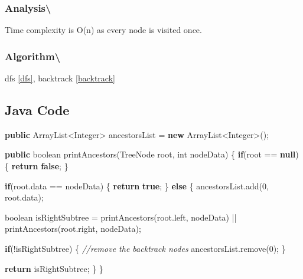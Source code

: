 \documentclass[]{book}
\newenvironment{Shaded}{\begin{snugshade}}{\end{snugshade}}
\newcommand{\BuiltInTok}[1]{#1}
\newcommand{\CommentTok}[1]{\textcolor[rgb]{0.56,0.35,0.01}{\textit{#1}}}
\newcommand{\DataTypeTok}[1]{\textcolor[rgb]{0.13,0.29,0.53}{#1}}
\newcommand{\DecValTok}[1]{\textcolor[rgb]{0.00,0.00,0.81}{#1}}
\newcommand{\FunctionTok}[1]{\textcolor[rgb]{0.00,0.00,0.00}{#1}}
\newcommand{\KeywordTok}[1]{\textcolor[rgb]{0.13,0.29,0.53}{\textbf{#1}}}
\newcommand{\NormalTok}[1]{#1}
\begin{document}
\hypertarget{analysis-93}{%
\subsubsection{Analysis\textbackslash{}}\label{analysis-93}}

Time complexity is O(n) as every node is visited once.

\hypertarget{algorithm-95}{%
\subsubsection{Algorithm\textbackslash{}}\label{algorithm-95}}

dfs \ref{dfs}, backtrack \ref{backtrack}

\hypertarget{java-code-56}{%
\subsection{Java Code}\label{java-code-56}}

\begin{Shaded}
\begin{Highlighting}[]
\KeywordTok{public} \BuiltInTok{ArrayList}\NormalTok{<}\BuiltInTok{Integer}\NormalTok{> ancestorsList = }\KeywordTok{new} \BuiltInTok{ArrayList}\NormalTok{<}\BuiltInTok{Integer}\NormalTok{>();}

\KeywordTok{public} \DataTypeTok{boolean} \FunctionTok{printAncestors}\NormalTok{(}\BuiltInTok{TreeNode}\NormalTok{ root, }\DataTypeTok{int}\NormalTok{ nodeData) \{}
    \KeywordTok{if}\NormalTok{(root == }\KeywordTok{null}\NormalTok{) \{}
        \KeywordTok{return} \KeywordTok{false}\NormalTok{;}
\NormalTok{    \}}

    \KeywordTok{if}\NormalTok{(root.}\FunctionTok{data}\NormalTok{ == nodeData) \{}
        \KeywordTok{return} \KeywordTok{true}\NormalTok{;}
\NormalTok{    \} }\KeywordTok{else}\NormalTok{ \{}
\NormalTok{        ancestorsList.}\FunctionTok{add}\NormalTok{(}\DecValTok{0}\NormalTok{, root.}\FunctionTok{data}\NormalTok{);}

        \DataTypeTok{boolean}\NormalTok{ isRightSubtree = }\FunctionTok{printAncestors}\NormalTok{(root.}\FunctionTok{left}\NormalTok{, nodeData) || }\FunctionTok{printAncestors}\NormalTok{(root.}\FunctionTok{right}\NormalTok{, nodeData);}

        \KeywordTok{if}\NormalTok{(!isRightSubtree) \{}
            \CommentTok{//remove the backtrack nodes}
\NormalTok{            ancestorsList.}\FunctionTok{remove}\NormalTok{(}\DecValTok{0}\NormalTok{);}
\NormalTok{        \}}

        \KeywordTok{return}\NormalTok{ isRightSubtree;}
\NormalTok{    \}}
\NormalTok{\}}
\end{Highlighting}
\end{Shaded}
\end{document}
